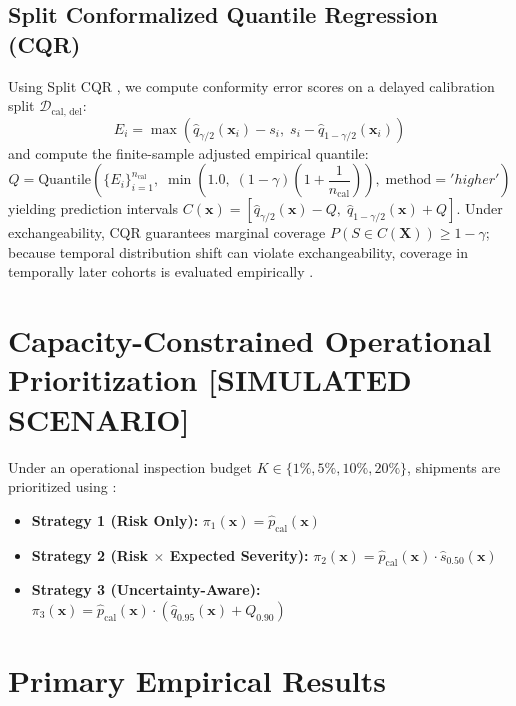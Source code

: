 \documentclass[11pt,a4paper]{article}
\begin{document}
\subsection{Split Conformalized Quantile Regression (CQR)}
Using Split CQR \cite{romano2019cqr}, we compute conformity error scores on a delayed calibration split $\mathcal{D}_{\text{cal, del}}$:
\begin{equation}
E_i = \max\left(\hat{q}_{\gamma/2}(\mathbf{x}_i) - s_i, \; s_i - \hat{q}_{1 - \gamma/2}(\mathbf{x}_i)\right)
\end{equation}
and compute the finite-sample adjusted empirical quantile:
\begin{equation}
Q = \text{Quantile}\left(\{E_i\}_{i=1}^{n_{\text{cal}}}, \; \min\left(1.0, \; (1 - \gamma)\left(1 + \frac{1}{n_{\text{cal}}}\right)\right), \; \text{method}='higher'\right)
\end{equation}
yielding prediction intervals $C(\mathbf{x}) = [\hat{q}_{\gamma/2}(\mathbf{x}) - Q, \; \hat{q}_{1 - \gamma/2}(\mathbf{x}) + Q]$. Under exchangeability, CQR guarantees marginal coverage $P(S \in C(\mathbf{X})) \ge 1 - \gamma$; because temporal distribution shift can violate exchangeability, coverage in temporally later cohorts is evaluated empirically \cite{barber2023beyond, gibbs2021adaptive}.

\section{Capacity-Constrained Operational Prioritization [SIMULATED SCENARIO]}
Under an operational inspection budget $K \in \{1\%, 5\%, 10\%, 20\%\}$, shipments are prioritized using \cite{bastani2021efficient}:
\begin{itemize}
    \item \textbf{Strategy 1 (Risk Only):} $\pi_1(\mathbf{x}) = \hat{p}_{\text{cal}}(\mathbf{x})$
    \item \textbf{Strategy 2 (Risk $\times$ Expected Severity):} $\pi_2(\mathbf{x}) = \hat{p}_{\text{cal}}(\mathbf{x}) \cdot \hat{s}_{0.50}(\mathbf{x})$
    \item \textbf{Strategy 3 (Uncertainty-Aware):} $\pi_3(\mathbf{x}) = \hat{p}_{\text{cal}}(\mathbf{x}) \cdot (\hat{q}_{0.95}(\mathbf{x}) + Q_{0.90})$
\end{itemize}

\section{Primary Empirical Results}
\end{document}
